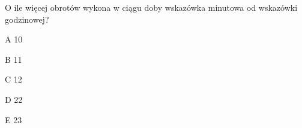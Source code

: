 \begin{tresc}
O ile więcej obrotów wykona w ciągu doby wskazówka minutowa od wskazówki godzinowej?
\end{tresc}
\begin{wariant}{A} 10 \end{wariant}
\begin{wariant}{B} 11 \end{wariant}
\begin{wariant}{C} 12 \end{wariant}
\begin{wariant}{D} 22 \end{wariant}
\begin{wariant}{E} 23 \end{wariant}
